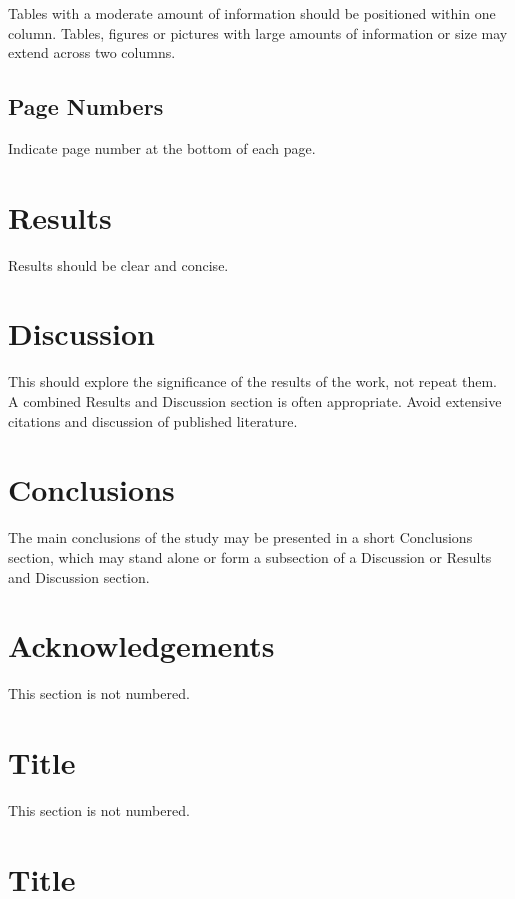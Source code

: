 \documentclass{IACpaper}
\begin{document}
      Tables with a moderate amount of information should be positioned within one column. Tables, figures or pictures with large amounts of information or size may extend across two columns.

    \subsection{Page Numbers}

      Indicate page number at the bottom of each page.

  \section{Results}

    Results should be clear and concise.

  \section{Discussion}

    This should explore the significance of the results of the work, not repeat them. A combined Results and Discussion section is often appropriate. Avoid extensive citations and discussion of published literature.

  \section{Conclusions}

    The main conclusions of the study may be presented in a short Conclusions section, which may stand alone or form a subsection of a Discussion or Results and Discussion section.

  \section*{Acknowledgements}

    This section is not numbered.

  \appendix

  \section{Title}

    This section is not numbered.

  \section{Title}
\end{document}
